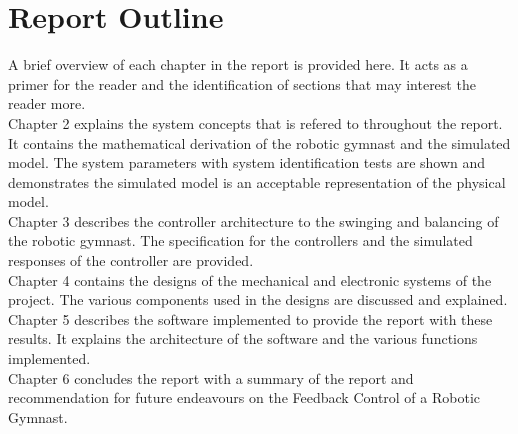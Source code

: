 \section{Report Outline}

A brief overview of each chapter in the report is provided here. It acts as a primer for the reader and the identification of sections that may interest the reader more.\\

Chapter 2 explains the system concepts that is refered to throughout the report. It contains the mathematical derivation of the robotic gymnast and the simulated model. The system parameters with system identification tests are shown and demonstrates the simulated model is an acceptable representation of the physical model.\\

Chapter 3 describes the controller architecture to the swinging and balancing of the robotic gymnast. The specification for the controllers and the simulated responses of the controller are provided.\\

Chapter 4 contains the designs of the mechanical and electronic systems of the project. The various components used in the designs are discussed and explained.\\

Chapter 5 describes the software implemented to provide the report with these results. It explains the architecture of the software and the various functions implemented.\\

Chapter 6 concludes the report with a summary of the report and recommendation for future endeavours on the Feedback Control of a Robotic Gymnast. 

 
